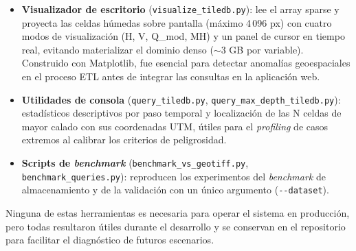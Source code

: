 \begin{itemize}
\item \textbf{Visualizador de escritorio} (\texttt{visualize\_tiledb.py}): lee el array sparse y proyecta las celdas húmedas sobre pantalla (máximo 4\,096 px) con cuatro modos de visualización (H, V, Q\_mod, MH) y un panel de cursor en tiempo real, evitando materializar el dominio denso ($\sim$3 GB por variable). Construido con Matplotlib, fue esencial para detectar anomalías geoespaciales en el proceso ETL antes de integrar las consultas en la aplicación web.
\item \textbf{Utilidades de consola} (\texttt{query\_tiledb.py}, \texttt{query\_max\_depth\_tiledb.py}): estadísticos descriptivos por paso temporal y localización de las N celdas de mayor calado con sus coordenadas UTM, útiles para el \textit{profiling} de casos extremos al calibrar los criterios de peligrosidad.
\item \textbf{Scripts de \textit{benchmark}} (\texttt{benchmark\_vs\_geotiff.py}, \texttt{benchmark\_queries.py}): reproducen los experimentos del \textit{benchmark} de almacenamiento y de la validación con un único argumento (\texttt{-\/-dataset}).
\end{itemize}

Ninguna de estas herramientas es necesaria para operar el sistema en producción, pero todas resultaron útiles durante el desarrollo y se conservan en el repositorio para facilitar el diagnóstico de futuros escenarios.
